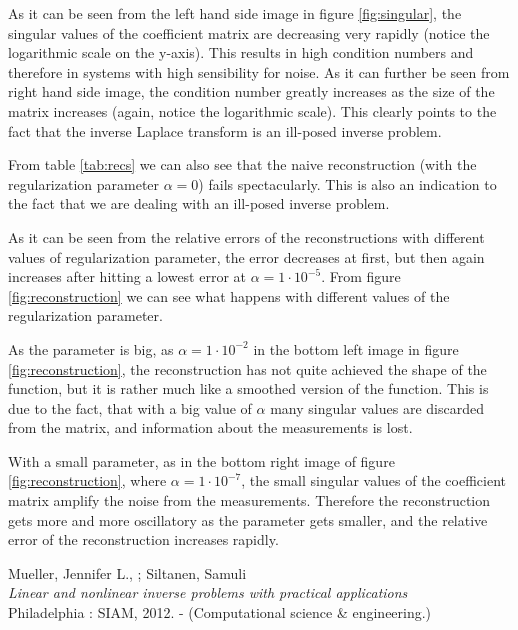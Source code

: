 \documentclass[12pt,a4]{article}
\begin{document}
As it can be seen from the left hand side image in figure \ref{fig:singular}, the singular values of the coefficient matrix are decreasing very rapidly (notice the logarithmic scale on the y-axis). This results in high condition numbers and therefore in systems with high sensibility for noise. As it can further be seen from right hand side image, the condition number greatly increases as the size of the matrix increases (again, notice the logarithmic scale). This clearly points to the fact that the inverse Laplace transform is an ill-posed inverse problem.

From table \ref{tab:recs} we can also see that the naive reconstruction (with the regularization parameter $\alpha = 0$) fails spectacularly. This is also an indication to the fact that we are dealing with an ill-posed inverse problem.

As it can be seen from the relative errors of the reconstructions with different values of regularization parameter, the error decreases at first, but then again increases after hitting a lowest error at $\alpha = 1 \cdot 10^{-5}$. From figure \ref{fig:reconstruction} we can see what happens with different values of the regularization parameter.

As the parameter is big, as $\alpha = 1 \cdot 10^{-2}$ in the bottom left image in figure \ref{fig:reconstruction}, the reconstruction has not quite achieved the shape of the function, but it is rather much like a smoothed version of the function. This is due to the fact, that with a big value of $\alpha$ many singular values are discarded from the matrix, and information about the measurements is lost.

With a small parameter, as in the bottom right image of figure \ref{fig:reconstruction}, where $\alpha = 1 \cdot 10^{-7}$, the small singular values of the coefficient matrix amplify the noise from the measurements. Therefore the reconstruction gets more and more oscillatory as the parameter gets smaller, and the relative error of the reconstruction increases rapidly.



\newpage
\begin{thebibliography}{9}

Mueller, Jennifer L., ; Siltanen, Samuli \\
\emph{Linear and nonlinear inverse problems with practical applications} \\ Philadelphia : SIAM, 2012. - (Computational science \& engineering.)

\end{thebibliography}
\end{document}
